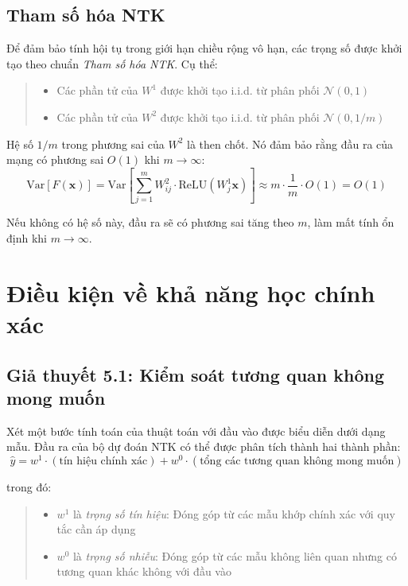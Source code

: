 \subsection{Tham số hóa NTK}

Để đảm bảo tính hội tụ trong giới hạn chiều rộng vô hạn, các trọng số được khởi tạo theo chuẩn \textit{Tham số hóa NTK}. Cụ thể:
\begin{quote}
\begin{itemize}
    \item Các phần tử của $W^1$ được khởi tạo i.i.d. từ phân phối $\mathcal{N}(0, 1)$
    \item Các phần tử của $W^2$ được khởi tạo i.i.d. từ phân phối $\mathcal{N}(0, 1/m)$
\end{itemize}
\end{quote}

Hệ số $1/m$ trong phương sai của $W^2$ là then chốt. Nó đảm bảo rằng đầu ra của mạng có phương sai $O(1)$ khi $m \rightarrow \infty$:
\begin{equation}
    \text{Var}[F(\mathbf{x})] = \text{Var}\left[\sum_{j=1}^{m} W^2_{ij} \cdot \text{ReLU}(W^1_j \mathbf{x})\right] \approx m \cdot \frac{1}{m} \cdot O(1) = O(1)
\end{equation}

Nếu không có hệ số này, đầu ra sẽ có phương sai tăng theo $m$, làm mất tính ổn định khi $m \rightarrow \infty$.

\section{Điều kiện về khả năng học chính xác}

\subsection{Giả thuyết 5.1: Kiểm soát tương quan không mong muốn}

Xét một bước tính toán của thuật toán với đầu vào được biểu diễn dưới dạng mẫu. Đầu ra của bộ dự đoán NTK có thể được phân tích thành hai thành phần:
\begin{equation}
    \hat{y} = w^1 \cdot (\text{tín hiệu chính xác}) + w^0 \cdot (\text{tổng các tương quan không mong muốn})
\end{equation}

trong đó:
\begin{quote}
\begin{itemize}
    \item $w^1$ là \textit{trọng số tín hiệu}: Đóng góp từ các mẫu khớp chính xác với quy tắc cần áp dụng
    \item $w^0$ là \textit{trọng số nhiễu}: Đóng góp từ các mẫu không liên quan nhưng có tương quan khác không với đầu vào
\end{itemize}
\end{quote}


